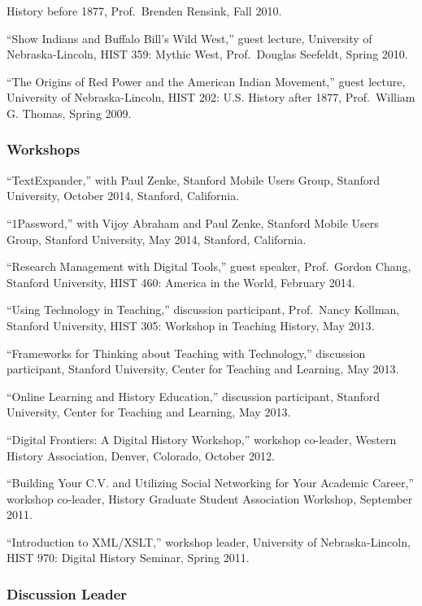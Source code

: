 History before 1877, Prof.~Brenden Rensink, Fall 2010.

``Show Indians and Buffalo Bill's Wild West,'' guest lecture, University
of Nebraska-Lincoln, HIST 359: Mythic West, Prof.~Douglas Seefeldt,
Spring 2010.

``The Origins of Red Power and the American Indian Movement,'' guest
lecture, University of Nebraska-Lincoln, HIST 202: U.S. History after
1877, Prof.~William G. Thomas, Spring 2009.

\subsubsection{Workshops}\label{workshops}

``TextExpander,'' with Paul Zenke, Stanford Mobile Users Group, Stanford
University, October 2014, Stanford, California.

``1Password,'' with Vijoy Abraham and Paul Zenke, Stanford Mobile Users
Group, Stanford University, May 2014, Stanford, California.

``Research Management with Digital Tools,'' guest speaker, Prof.~Gordon
Chang, Stanford University, HIST 460: America in the World, February
2014.

``Using Technology in Teaching,'' discussion participant, Prof.~Nancy
Kollman, Stanford University, HIST 305: Workshop in Teaching History,
May 2013.

``Frameworks for Thinking about Teaching with Technology,'' discussion
participant, Stanford University, Center for Teaching and Learning, May
2013.

``Online Learning and History Education,'' discussion participant,
Stanford University, Center for Teaching and Learning, May 2013.

``Digital Frontiers: A Digital History Workshop,'' workshop co-leader,
Western History Association, Denver, Colorado, October 2012.

``Building Your C.V. and Utilizing Social Networking for Your Academic
Career,'' workshop co-leader, History Graduate Student Association
Workshop, September 2011.

``Introduction to XML/XSLT,'' workshop leader, University of
Nebraska-Lincoln, HIST 970: Digital History Seminar, Spring 2011.

\subsubsection{Discussion Leader}\label{discussion-leader}


